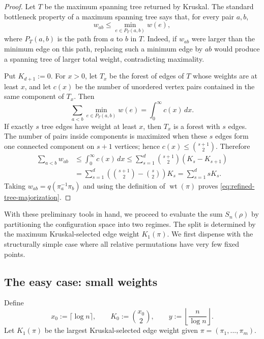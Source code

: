 \documentclass[10pt,a4paper]{amsart}
\renewcommand\le{\leqslant}
\newcommand{\wt}{\operatorname{wt}}
\begin{document}
\begin{proof}
Let $T$ be the maximum spanning tree returned by Kruskal. The standard bottleneck property of a maximum spanning tree says that, for every pair $a,b$,
\[
        w_{ab}\le \min_{e\in P_T(a,b)}w(e),
\]
where $P_T(a,b)$ is the path from $a$ to $b$ in $T$. Indeed, if $w_{ab}$ were larger than the minimum edge on this path, replacing such a minimum edge by $ab$ would produce a spanning tree of larger total weight, contradicting maximality.

Put $K_{d+1}:=0$. For $x>0$, let $T_x$ be the forest of edges of $T$ whose weights are at least $x$, and let $c(x)$ be the number of unordered vertex pairs contained in the same component of $T_x$. Then
\[
        \sum_{a<b}\min_{e\in P_T(a,b)}w(e)=\int_0^\infty c(x)\,dx .
\]
If exactly $s$ tree edges have weight at least $x$, then $T_x$ is a forest with $s$ edges. The number of pairs inside components is maximized when these $s$ edges form one connected component on $s+1$ vertices; hence $c(x)\le \binom{s+1}{2}$. Therefore
\begin{align*}
        \sum_{a<b}w_{ab}
        &\le \int_0^\infty c(x)\,dx
         \le \sum_{s=1}^d \binom{s+1}{2}(K_s-K_{s+1})        \\
        &=\sum_{s=1}^d
          \left(\binom{s+1}{2}-\binom{s}{2}\right)K_s
          =\sum_{s=1}^d sK_s .
\end{align*}
Taking $w_{ab}=q(\pi_a^{-1}\pi_b)$ and using the definition of $\wt(\pi)$ proves \eqref{eq:refined-tree-majorization}.
\end{proof}

With these preliminary tools in hand, we proceed to evaluate the sum \(S_n(\rho)\) by partitioning the configuration space into two regimes. The split is determined by the maximum Kruskal-selected edge weight \(K_1(\pi)\). We first dispense with the structurally simple case where all relative permutations have very few fixed points.

\medskip

\subsection{The easy case: small weights}\label{subsec:easy_regime}

Define
\[
        x_0:=\lceil\log n\rceil,
        \qquad K_0:=\binom{x_0}2,
        \qquad
        y:=\left\lfloor\frac n{\log n}\right\rfloor .
\]
Let $K_1(\pi)$ be the largest Kruskal-selected edge weight given $\pi=(\pi_1,...,\pi_m)$.
\end{document}

